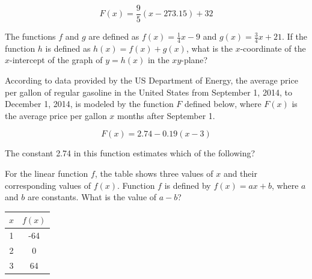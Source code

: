 \[
F(x) = \frac{9}{5}(x - 273.15) + 32
\]

\vspace{0.75em}



\newpage
\noindent\markforreview

\vspace{1em}

The functions \( f \) and \( g \) are defined as \( f(x) = \frac{1}{4}x - 9 \) and \( g(x) = \frac{3}{4}x + 21 \). If the function \( h \) is defined as \( h(x) = f(x) + g(x) \), what is the \( x \)-coordinate of the \( x \)-intercept of the graph of \( y = h(x) \) in the \( xy \)-plane?



\vspace{2em}
\noindent\markforreview

\vspace{1em}

According to data provided by the US Department of Energy, the average price per gallon of regular gasoline in the United States from September 1, 2014, to December 1, 2014, is modeled by the function \( F \) defined below, where \( F(x) \) is the average price per gallon \( x \) months after September 1.

\[
F(x) = 2.74 - 0.19(x - 3)
\]

The constant 2.74 in this function estimates which of the following?

\vspace{0.75em}




\newpage
\noindent\markforreview

\vspace{1em}

For the linear function \( f \), the table shows three values of \( x \) and their corresponding values of \( f(x) \). Function \( f \) is defined by \( f(x) = ax + b \), where \( a \) and \( b \) are constants. What is the value of \( a - b \)?

\begin{center}
\begin{tabular}{|c|c|}
\hline
$x$ & $f(x)$ \\
\hline
1 & -64 \\
2 & 0 \\
3 & 64 \\
\hline
\end{tabular}
\end{center}


